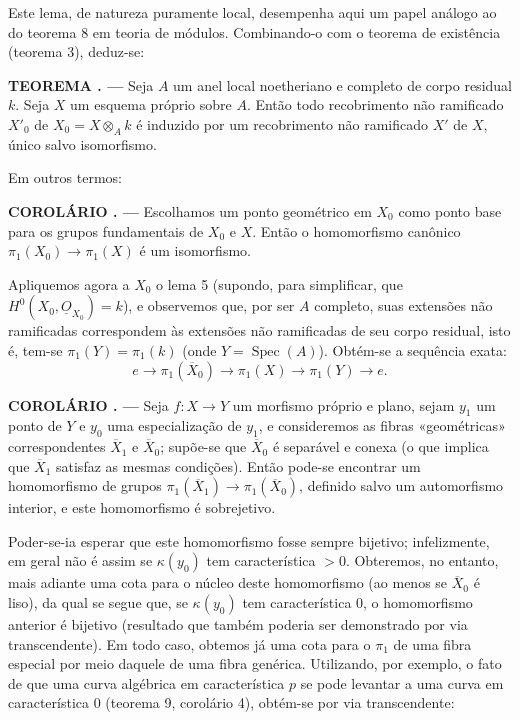 \documentclass[11pt,twoside,openany]{book}
\numberwithin{equation}{section}
\newcommand{\src}[1]{%
  \phantomsection\hypertarget{src:#1}{}%
  \marginpar{\raggedleft\footnotesize\sffamily #1}%
}
\newcommand{\Osh}{\underline{O}}
\theoremstyle{plain}
\theoremstyle{definition}
\theoremstyle{remark}
\newcommand{\result}[2]{%
  \par\medskip\noindent\textbf{#1%
  \if\relax\detokenize{#2}\relax\else\space#2\fi. ---}\enspace
}
\newcommand{\FgaUnitKey}{frontmatter}
\renewcommand{\src}[1]{%
  \phantomsection\hypertarget{src:\FgaUnitKey:#1}{}%
  \marginpar{\raggedleft\footnotesize\sffamily #1}%
}
\begin{document}
Este lema, de natureza puramente local, desempenha aqui um papel análogo ao do
teorema 8 em teoria de módulos. Combinando-o com o teorema de existência
(teorema 3), deduz-se:

\result{TEOREMA}{12} Seja $A$ um anel local noetheriano e completo de corpo
residual $k$. Seja $X$ um esquema próprio sobre $A$. Então todo recobrimento
não ramificado $X'_0$ de $X_0=X\otimes_A k$ é induzido por um recobrimento não
ramificado $X'$ de $X$, único salvo isomorfismo.

Em outros termos:

\result{COROLÁRIO}{1} Escolhamos um ponto geométrico em $X_0$ como ponto base para
os grupos fundamentais de $X_0$ e $X$. Então o homomorfismo canônico
$\pi_1(X_0)\longrightarrow\pi_1(X)$ é um isomorfismo.

Apliquemos agora a $X_0$ o lema 5 (supondo, para simplificar, que
$H^0(X_0,\Osh_{X_0})=k$), e observemos que, por ser $A$ completo, suas
extensões não ramificadas correspondem às extensões não ramificadas de seu
corpo residual, isto é, tem-se $\pi_1(Y)=\pi_1(k)$ (onde
$Y=\operatorname{Spec}(A)$). Obtém-se a sequência exata:
\[
  e\longrightarrow\pi_1(\overline X_0)
  \longrightarrow\pi_1(X)\longrightarrow\pi_1(Y)\longrightarrow e.
\]

\result{COROLÁRIO}{2} Seja $f:X\longrightarrow Y$ um morfismo próprio e plano,
sejam $y_1$ um ponto de $Y$ e $y_0$ uma especialização de $y_1$, e consideremos
as fibras «geométricas» correspondentes $\overline X_1$ e $\overline X_0$;
supõe-se que $\overline X_0$ é separável e conexa (o que implica que
$\overline X_1$ satisfaz as mesmas condições). Então pode-se encontrar um
homomorfismo de grupos
$\pi_1(\overline X_1)\longrightarrow\pi_1(\overline X_0)$, definido salvo um
automorfismo interior, e este homomorfismo é sobrejetivo.

\src{217}
Poder-se-ia esperar que este homomorfismo fosse sempre bijetivo; infelizmente,
em geral não é assim se $\kappa(y_0)$ tem característica $>0$. Obteremos,
no entanto, mais adiante uma cota para o núcleo deste homomorfismo (ao menos se
$\overline X_0$ é liso), da qual se segue que, se $\kappa(y_0)$ tem
característica $0$, o homomorfismo anterior é bijetivo (resultado que também
poderia ser demonstrado por via transcendente). Em todo caso, obtemos já uma cota
para o $\pi_1$ de uma fibra especial por meio daquele de uma fibra genérica.
Utilizando, por exemplo, o fato de que uma curva algébrica em característica
$p$ se pode levantar a uma curva em característica $0$ (teorema 9, corolário
4), obtém-se por via transcendente:
\end{document}

